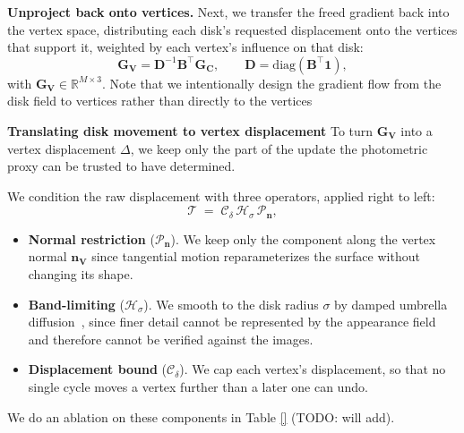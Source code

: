\textbf{Unproject back onto vertices.}
Next, we transfer the freed gradient back into the vertex space, distributing each
disk's requested displacement onto the vertices that support it, weighted by each
vertex's influence on that disk:
%
\begin{equation}
  \label{eq:pullback}
  \mathbf{G}_{\mathbf{V}}
  = \mathbf{D}^{-1}\mathbf{B}^{\top}\mathbf{G}_{\mathbf{C}},
  \qquad
  \mathbf{D} = \mathrm{diag}\!\left(\mathbf{B}^{\top}\mathbf{1}\right),
\end{equation}
%
with $\mathbf{G}_{\mathbf{V}} \in \mathbb{R}^{M \times 3}$.
Note that we intentionally design the gradient flow from the disk field to vertices rather than directly to the vertices 


\textbf{Translating disk movement to vertex displacement}
To turn $\mathbf{G_V}$ into a vertex displacement $\Delta$, we keep only the part of the update the photometric proxy can be trusted to have determined. 

We condition the raw displacement with three operators, applied right to left:
%
\begin{equation}
\label{eq:conditioning}
  \mathcal{T} \;=\; \mathcal{C}_{\delta}\,\mathcal{H}_{\sigma}\,\mathcal{P}_{\mathbf{n}},
\end{equation}
%
\begin{itemize}
  \item \textbf{Normal restriction} ($\mathcal{P}_{\mathbf{n}}$). We keep only the
    component along the vertex normal $\mathbf{{n}_{V}}$ since tangential motion reparameterizes
    the surface without changing its shape.
  \item \textbf{Band-limiting} ($\mathcal{H}_{\sigma}$). We smooth to the disk
    radius $\sigma$ by damped umbrella diffusion~\citep{umbrella-diffusion}, since finer detail cannot be
    represented by the appearance field and therefore cannot be verified against
    the images.
  \item \textbf{Displacement bound} ($\mathcal{C}_{\delta}$). We cap each
    vertex's displacement, so that no single cycle moves a vertex further than a
    later one can undo.
\end{itemize}

We do an ablation on these components in Table \ref{} (TODO: will add).


